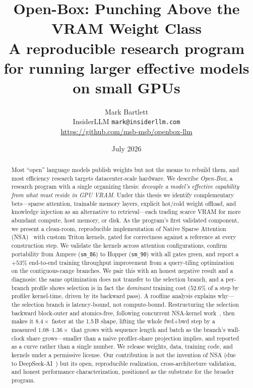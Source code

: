 \documentclass[11pt]{article}
\title{\textbf{Open-Box: Punching Above the VRAM Weight Class}\\[0.3em]
\large A reproducible research program for running larger effective models on small GPUs}
\author{Mark Bartlett\\ \small InsiderLLM \quad \texttt{mark@insiderllm.com}\\ \small \url{https://github.com/msb-msb/openbox-llm}}
\date{July 2026}
\begin{document}
\maketitle

\begin{abstract}
\noindent
Most ``open'' language models publish weights but not the means to rebuild them, and most
efficiency research targets datacenter-scale hardware. We describe \emph{Open-Box}, a research
program with a single organizing thesis: \emph{decouple a model's effective capability from what
must reside in GPU VRAM}. Under this thesis we identify complementary bets---sparse attention,
trainable memory layers, explicit hot/cold weight offload, and knowledge injection as an
alternative to retrieval---each trading scarce VRAM for more abundant compute, host memory, or
disk. As the program's first validated component, we present a clean-room, reproducible
implementation of Native Sparse Attention (NSA)~\cite{nsa} with custom Triton kernels, gated for
correctness against a reference at every construction step. We validate the kernels across
attention configurations, confirm portability from Ampere (\texttt{sm\_86}) to Hopper
(\texttt{sm\_90}) with all gates green, and report a $+53\%$ end-to-end training throughput
improvement from a query-tiling optimization on the contiguous-range branches. We pair this with
an honest negative result and a diagnosis: the same optimization does not transfer to the
selection branch, and a per-branch profile shows selection is in fact the \emph{dominant} training
cost ($52.6\%$ of a step by profiler kernel-time, driven by its backward pass). A roofline analysis explains why---the
selection branch is latency-bound, not compute-bound. Restructuring the selection backward
block-outer and atomics-free, following concurrent NSA-kernel work~\cite{fsa}, then makes it
$8.4\times$ faster at the 1.5\,B shape, lifting the whole fwd+bwd step by a measured
$1.08$--$1.36\times$ that grows with sequence length and batch as the branch's wall-clock share
grows---smaller than a naive profiler-share projection implies, and reported as a curve rather
than a single number. We release weights, data, training code,
and kernels under a permissive license. Our contribution is not the invention of NSA (due to
DeepSeek-AI~\cite{nsa}) but its open, reproducible realization, cross-architecture validation, and
honest performance characterization, positioned as the substrate for the broader program.
\end{abstract}
\end{document}
